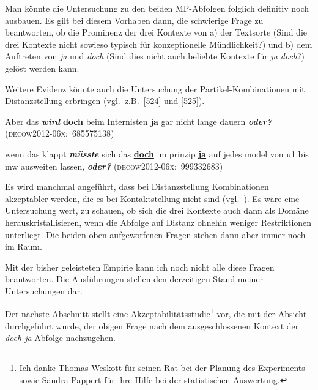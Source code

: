 Man könnte die Untersuchung zu den beiden MP-Abfolgen folglich definitiv noch ausbauen. Es gilt bei diesem Vorhaben dann, die schwierige Frage zu beantworten, ob die Prominenz der drei Kontexte von a) der Textsorte (Sind die drei Kontexte nicht sowieso typisch für  konzeptionelle Mündlichkeit?) und b) dem Auftreten von \textit{ja} und \textit{doch} (Sind dies nicht auch beliebte Kontexte für \textit{ja doch}?) gelöst werden kann.

Weitere Evidenz könnte auch die Untersuchung der Partikel-Kombinationen mit Distanzstellung erbringen (vgl.\ z.B.\ \ref{524} und \ref{525}).
	
\begin{exe}
	\ex\label{524} 
	Aber das \textit{\textbf{wird}} \underline{\textbf{doch}} beim Internisten \underline{\textbf{ja}} gar nicht lange dauern 			\textbf{\textit{oder?}}
	\newline
	\hbox{}\hfill\hbox{\scshape(decow2012-06x: 685575138)}
\end{exe}		

\begin{exe}
	\ex\label{525} 
	wenn das klappt \textbf{\textit{müsste}} sich das \underline{\textbf{doch}} im prinzip \underline{\textbf{ja}} auf jedes 			model von u1 bis mw ausweiten lassen, \textbf{\textit{oder?}}                                                 
	\hfill\hbox{\scshape(decow2012-06x: 999332683)}
\end{exe}		
Es wird manchmal angeführt, dass bei Distanzstellung  Kombinationen akzep\-tabler werden, die es bei Kontaktstellung  nicht sind (vgl.\ \citealt[219]{Dahl1988}). Es wäre eine Untersuchung wert, zu schauen, ob sich die drei Kontexte auch dann als Domäne herauskristallisieren, wenn die Abfolge auf Distanz ohnehin weniger Restriktionen unterliegt. Die beiden oben aufgeworfenen Fragen stehen dann aber immer noch im Raum.

Mit der bisher geleisteten Empirie kann ich noch nicht alle diese Fragen beantworten. Die Ausführungen stellen den derzeitigen Stand meiner Untersuchungen dar.\largerpage

Der nächste Abschnitt stellt eine Akzeptabilitätsstudie\footnote{Ich danke Thomas Weskott für seinen Rat bei der Planung des Experiments sowie Sandra Pappert für ihre Hilfe bei der statistischen Auswertung.} vor, die mit der Absicht durchgeführt wurde, der obigen Frage nach dem ausgeschlossenen Kontext der \textit{doch ja}-Abfolge nachzugehen.

